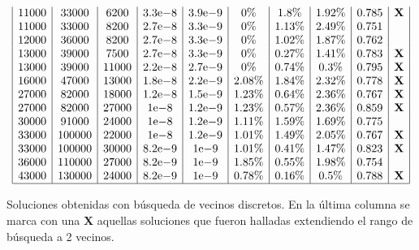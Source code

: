 \documentclass{llncs}
\newcommand{\expnumber}[2]{{#1}\mathrm{e}{#2}}
\begin{document}
\begin{table}[H]
$$\begin{array}{|c|c|c|c|c|c|c|c|c|c|}
		11000 & 33000 & 6200 & \expnumber{3.3}{-8} & \expnumber{3.9}{-9} & 0\% & 1.8\% & 1.92\% & 0.785 & \textbf{X} \\
		11000 & 33000 & 8200 & \expnumber{2.7}{-8} & \expnumber{3.3}{-9}  & 0\% & 1.13\% & 2.49\% & 0 .751&\\
		12000 & 36000 & 8200 & \expnumber{2.7}{-8} & \expnumber{3.3}{-9}  & 0\% & 1.02\% & 1.87\% & 0.762 & \\
		13000 & 39000 & 7500 & \expnumber{2.7}{-8} & \expnumber{3.3}{-9} & 0\% & 0.27\% & 1.41\% & 0.783 & \textbf{X} \\
		13000 & 39000 & 11000 & \expnumber{2.2}{-8} & \expnumber{2.7}{-9} & 0\% & 0.74\% & 0.3\% & 0.795 & \textbf{X} \\
		16000 & 47000 & 13000 & \expnumber{1.8}{-8} & \expnumber{2.2}{-9} & 2.08\% & 1.84\% & 2.32\% & 0.778 & \textbf{X} \\ 
		27000 & 82000 & 18000 & \expnumber{1.2}{-8} & \expnumber{1.5}{-9} & 1.23\% & 0.64\% & 2.36\% & 0.767 & \textbf{X} \\ 
		27000 & 82000 & 27000 & \expnumber{1}{-8} & \expnumber{1.2}{-9} & 1.23\% & 0.57\% & 2.36\% & 0.859 & \textbf{X} \\
		30000 & 91000 & 24000 & \expnumber{1}{-8} & \expnumber{1.2}{-9}  & 1.11\% & 1.59\% & 1.69\% & 0.775 & \\
		33000 & 100000 & 22000 & \expnumber{1}{-8} & \expnumber{1.2}{-9} & 1.01\% & 1.49\% & 2.05\% & 0.767 & \textbf{X} \\
		33000 & 100000 & 30000 & \expnumber{8.2}{-9} & \expnumber{1}{-9} & 1.01\% & 0.41\% & 1.47\% & 0.823 & \textbf{X} \\
		36000 & 110000 & 27000 & \expnumber{8.2}{-9} & \expnumber{1}{-9}  & 1.85\% & 0.55\% & 1.98\% & 0.754 & \\
		43000 & 130000 & 24000 & \expnumber{8.2}{-9} & \expnumber{1}{-9} & 0.78\% & 0.16\% & 0.5\% & 0.788 & \textbf{X} \\
		\hline
		\end{array}
		$$
		\caption{Soluciones obtenidas con búsqueda de vecinos discretos. En la última columna se marca con una \textbf{X} aquellas
		soluciones que fueron halladas extendiendo el rango de búsqueda a 2 vecinos.}
		\label{cuadroSolVecinos}
	\end{table}
	
\end{document}
